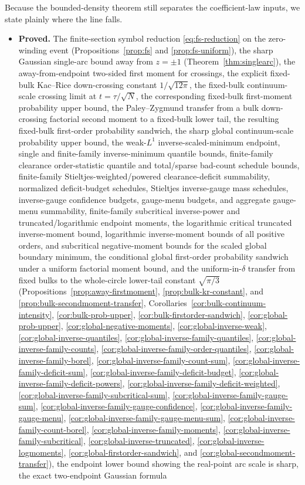 \documentclass[11pt]{amsart}
\numberwithin{equation}{section}
\theoremstyle{definition}
\theoremstyle{remark}
\begin{document}
Because the bounded-density theorem still separates the coefficient-law inputs, we state plainly where the line falls.
\begin{itemize}
\item \textbf{Proved.} The finite-section symbol reduction \eqref{eq:fs-reduction} on the zero-winding event (Propositions~\ref{prop:fs} and \ref{prop:fs-uniform}), the sharp Gaussian single-arc bound away from \(z=\pm1\) (Theorem~\ref{thm:singlearc}), the away-from-endpoint two-sided first moment for crossings, the explicit fixed-bulk Kac--Rice down-crossing constant \(1/\sqrt{12\pi}\), the fixed-bulk continuum-scale crossing limit at \(t=\tau/\sqrt N\), the corresponding fixed-bulk first-moment probability upper bound, the Paley--Zygmund transfer from a bulk down-crossing factorial second moment to a fixed-bulk lower tail, the resulting fixed-bulk first-order probability sandwich, the sharp global continuum-scale probability upper bound, the weak-\(L^1\) inverse-scaled-minimum endpoint, single and finite-family inverse-minimum quantile bounds, finite-family clearance order-statistic quantile and total/sparse bad-count schedule bounds, finite-family Stieltjes-weighted/powered clearance-deficit summability, normalized deficit-budget schedules, Stieltjes inverse-gauge mass schedules, inverse-gauge confidence budgets, gauge-menu budgets, and aggregate gauge-menu summability, finite-family subcritical inverse-power and truncated/logarithmic endpoint moments, the logarithmic critical truncated inverse-moment bound, logarithmic inverse-moment bounds of all positive orders, and subcritical negative-moment bounds for the scaled global boundary minimum, the conditional global first-order probability sandwich under a uniform factorial moment bound, and the uniform-in-\(\delta\) transfer from fixed bulks to the whole-circle lower-tail constant \(\sqrt{\pi/3}\) (Propositions~\ref{prop:away-firstmoment}, \ref{prop:bulk-kr-constant}, and \ref{prop:bulk-secondmoment-transfer}, Corollaries~\ref{cor:bulk-continuum-intensity}, \ref{cor:bulk-prob-upper}, \ref{cor:bulk-firstorder-sandwich}, \ref{cor:global-prob-upper}, \ref{cor:global-negative-moments}, \ref{cor:global-inverse-weak}, \ref{cor:global-inverse-quantiles}, \ref{cor:global-inverse-family-quantiles}, \ref{cor:global-inverse-family-counts}, \ref{cor:global-inverse-family-order-quantiles}, \ref{cor:global-inverse-family-borel}, \ref{cor:global-inverse-family-count-sum}, \ref{cor:global-inverse-family-deficit-sum}, \ref{cor:global-inverse-family-deficit-budget}, \ref{cor:global-inverse-family-deficit-powers}, \ref{cor:global-inverse-family-deficit-weighted}, \ref{cor:global-inverse-family-subcritical-sum}, \ref{cor:global-inverse-family-gauge-sum}, \ref{cor:global-inverse-family-gauge-confidence}, \ref{cor:global-inverse-family-gauge-menu}, \ref{cor:global-inverse-family-gauge-menu-sum}, \ref{cor:global-inverse-family-count-borel}, \ref{cor:global-inverse-family-moments}, \ref{cor:global-inverse-family-subcritical}, \ref{cor:global-inverse-truncated}, \ref{cor:global-inverse-logmoments}, \ref{cor:global-firstorder-sandwich}, and \ref{cor:global-secondmoment-transfer}), the endpoint lower bound showing the real-point arc scale is sharp, the exact two-endpoint Gaussian formula 
\end{itemize}
\end{document}
